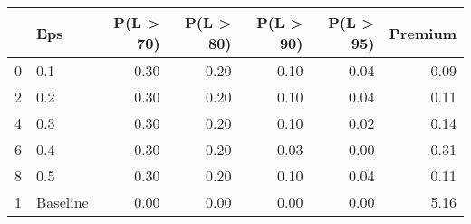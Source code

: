 \begin{tabular}{llrrrrr}
\toprule
{} &       Eps &  P(L > 70) &  P(L > 80) &  P(L > 90) &  P(L > 95) &  Premium \\
\midrule
0 &       0.1 &       0.30 &       0.20 &       0.10 &       0.04 &     0.09 \\
2 &       0.2 &       0.30 &       0.20 &       0.10 &       0.04 &     0.11 \\
4 &       0.3 &       0.30 &       0.20 &       0.10 &       0.02 &     0.14 \\
6 &       0.4 &       0.30 &       0.20 &       0.03 &       0.00 &     0.31 \\
8 &       0.5 &       0.30 &       0.20 &       0.10 &       0.04 &     0.11 \\
1 &  Baseline &       0.00 &       0.00 &       0.00 &       0.00 &     5.16 \\
\bottomrule
\end{tabular}
